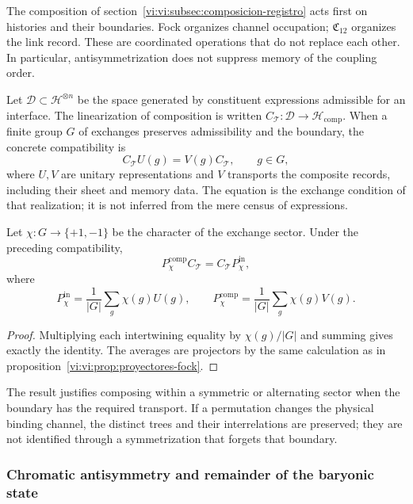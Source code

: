 The composition of section~\ref{vi:vi:subsec:composicion-registro}
acts first on histories and their boundaries. Fock organizes
channel occupation; \(\mathfrak C_{12}\) organizes the
link record. These are coordinated operations that do not
replace each other. In particular, antisymmetrization does not
suppress memory of the coupling order.

Let \(\mathcal D\subset\mathcal H^{\otimes n}\) be the space
generated by constituent expressions admissible for an
interface. The linearization of composition is written
\(C_{\mathcal T}:\mathcal D\to\mathcal H_{\mathrm{comp}}\).
When a finite group \(G\) of exchanges preserves
admissibility and the boundary, the concrete compatibility is
\[
 C_{\mathcal T}U(g)=V(g)C_{\mathcal T},\qquad g\in G,
\]
where \(U,V\) are unitary representations and \(V\) transports
the composite records, including their sheet and memory data.
The equation is the exchange
condition of that realization; it is not inferred from the mere
census of expressions.

\begin{proposition}
\label{vi:vi:prop:composicion-estadistica}
Let \(\chi:G\to\{+1,-1\}\) be the character of the exchange
sector. Under the preceding compatibility,
\[
 P_\chi^{\mathrm{comp}}C_{\mathcal T}
 =C_{\mathcal T}P_\chi^{\mathrm{in}},
\]
where
\[
 P_\chi^{\mathrm{in}}=\frac1{|G|}\sum_g\chi(g)U(g),
 \qquad
 P_\chi^{\mathrm{comp}}=\frac1{|G|}\sum_g\chi(g)V(g).
\]
\end{proposition}
\begin{proof}
Multiplying each intertwining equality by
\(\chi(g)/|G|\) and summing gives exactly the identity.
The averages are projectors by the same calculation as in
proposition~\ref{vi:vi:prop:proyectores-fock}.
\end{proof}

The result justifies composing within a symmetric
or alternating sector when the boundary has the required transport.
If a permutation changes the physical binding channel, the
distinct trees and their interrelations are preserved; they are not
identified through a symmetrization that forgets that boundary.

\subsubsection{Chromatic antisymmetry and remainder of the baryonic state}

